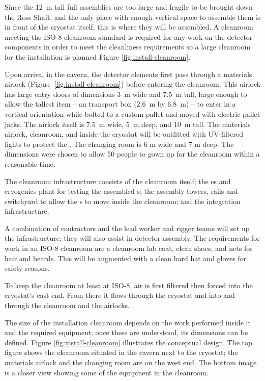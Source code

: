 Since the \SI{12}{m} tall full assemblies are too large and fragile to be brought down the Ross Shaft, and the only place with enough vertical space to assemble them is in front of the cryostat itself, this is where they will be assembled. A cleanroom meeting the ISO-8 cleanroom standard is required for any work on the detector components in order to meet the  cleanliness requirements so a large cleanroom for the installation is planned Figure \ref{fig:install-cleanroom}.   


Upon arrival in the cavern, the detector elements first pass through a materials airlock (Figure~\ref{fig:install-cleanroom}) before entering the cleanroom. This airlock has large entry doors of dimensions \SI{3}{m} wide and \SI{7.5}{m} tall, large enough to allow the tallest item -- an  transport box (\SI{2.6}{m} by \SI{6.8}{m}) -- to enter in a vertical orientation while bolted to a custom pallet and moved with electric pallet jacks. 
The airlock itself is \SI{7.5}{m} wide, \SI{5}{m} deep, and \SI{10}{m} tall. 
The materials airlock, cleanroom, and inside the cryostat will be outfitted with UV-filtered lights to protect the . 
The changing room is 6 \si{m} wide and 7 \si{m} deep. The dimensions were chosen to allow 50 people to gown up for the cleanroom within a reasonable time. 

The cleanroom infrastructure consists of the cleanroom itself; the \coldbox{}es and cryogenics plant for testing the assembled s; the assembly towers, rails and switchyard to allow the s to move inside the cleanroom; and the  integration infrastructure. 

A combination of contractors and the lead worker and rigger teams will set up the infrastructure;  they will also assist in detector assembly. 
The requirements for work in an ISO-8 cleanroom are a cleanroom lab coat, clean shoes, and nets for hair and beards.  This will be augmented with a clean hard hat and gloves for safety reasons. 

To keep the cleanroom at least at ISO-8, air is first filtered then forced into the cryostat's east end. 
From there it flows through the cryostat and into and through the cleanroom and the airlocks. 


The size of the installation cleanroom depends on the work performed inside it and the required equipment; once these are understood, its dimensions can be defined.  Figure \ref{fig:install-cleanroom} illustrates  the conceptual design. The top figure shows the cleanroom situated in the cavern next to the cryostat; the materials airlock and the changing room are on the west end. The bottom image is a closer view showing some of the equipment in the cleanroom. 





